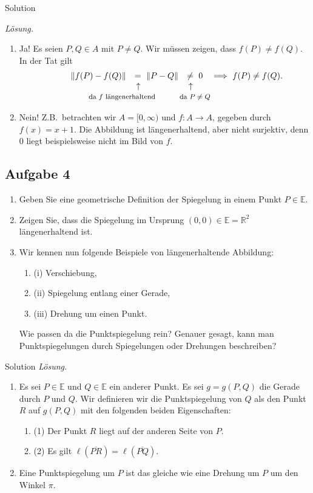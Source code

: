 \documentclass[12pt]{amsart}
\theoremstyle{plain}
\theoremstyle{remark}
\def\smuparrow{\hspace{0.07cm}\uparrow}
\def\R{\mathbb{R}}
\numberwithin{equation}{section}
\def\smup{\smuparrow}
\def\bnm{\begin{enumerate}}
\def\enm{\end{enumerate}}
\def\bnml{\begin{enumerate}[leftmargin=1.2cm]}
\def\ba{\begin{array}} \def\ea{\end{array}}
\def\ol{\overline}
\newcommand{\mfbox}[1]{\footnotesize{\mbox{#1}}}
\def\mindent{\hspace{1cm}}
\def\E{\mathbb{E}}
\def\nspace{\hspace{-0.3cm}}
\newcommand{\nbox}[1]{\nspace\mfbox{#1}}
\def\smup{\smuparrow}
\def\bnal{\begin{enumerate}[label=(\alph*),leftmargin=1.2cm]}
\begin{document}
\begin{taggedblock}{Solution}
    



\smallskip
\noindent \emph{L\"osung.}\mbox{}
\bnal
\item Ja! Es seien $P,Q\in A$ mit  $P\ne Q$. Wir m\"ussen zeigen, dass $f(P)\ne f(Q)$.
In der Tat  gilt 
\[ \mindent \ba{rlll} \|f(P)-f(Q)\|&=\,\,\|P-Q\|&\ne\,\, 0\quad \Longrightarrow \,\, f(P)\ne f(Q).\\
&\smup&\smup\\
&\hspace{-1.6cm}\nbox{da $f$ l\"angenerhaltend}&\nbox{da $P\ne Q$}\ea\]
\item Nein! Z.B.\ betrachten wir $A=[0,\infty)$ und $f\colon A\to A$, gegeben durch $f(x)=x+1$. Die Abbildung ist l\"angenerhaltend, aber nicht surjektiv, denn $0$ liegt beispielsweise nicht im Bild von $f$. 
\enm 

\end{taggedblock}

\subsection*{Aufgabe 4}
\mbox{}
\bnal
\item Geben Sie eine geometrische Definition der Spiegelung in einem Punkt $P\in \E$.
\item Zeigen Sie, dass die Spiegelung im Ursprung $(0,0)\in \E=\R^2$ l\"angenerhaltend ist.
\item 
Wir kennen nun folgende Beispiele von l\"angenerhaltende Abbildung:
\bnml
\item[(i)] Verschiebung,
\item[(ii)] Spiegelung entlang einer Gerade,
\item[(iii)]  Drehung um einen Punkt.
\enm
Wie passen da die Punktspiegelung rein? Genauer gesagt, kann man Punkt\-spiegelungen durch Spiegelungen oder Drehungen beschreiben?
\enm

\begin{taggedblock}{Solution}
\noindent \emph{L\"osung.}\mbox{}
\bnal
\item Es sei $P\in \E$ und $Q\in \E$ ein anderer  Punkt.
Es sei $g=g(P,Q)$ die Gerade durch $P$ und $Q$. Wir definieren wir die Punktspiegelung von $Q$ als den Punkt $R$ auf $g(P,Q)$ mit den folgenden beiden Eigenschaften:
\bnm
\item[(1)] Der Punkt $R$ liegt auf der anderen Seite von $P$.
\item[(2)] Es gilt $\ell(\ol{PR})=\ell(\ol{PQ})$.
\enm
\item Eine Punktspiegelung um $P$ ist das gleiche wie eine Drehung um $P$ um den Winkel $\pi$. 
\enm
\end{taggedblock}
\end{document}

